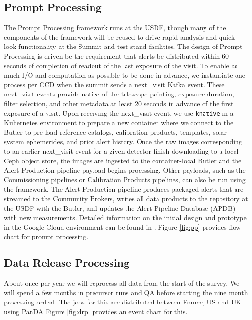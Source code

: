 \documentclass[11pt,twoside]{article}
\begin{document}
\subsection{Prompt Processing} \label{sec:prompt}
The Prompt Processing framework runs at the USDF, though many of the components of the framework will be reused to drive rapid analysis and quick-look functionality at the Summit and test stand facilities.
The design of Prompt Processing is driven be the requirement that alerts be distributed within 60 seconds of completion of readout of the last exposure of the visit.
To enable as much I/O and computation as possible to be done in advance, we instantiate one process per CCD when the summit sends a next\_visit Kafka event.
These next\_visit events provide notice of the telescope pointing, exposure duration, filter selection, and other metadata at least 20 seconds in advance of the first exposure of a visit.
Upon receiving the next\_visit event, we use \texttt{knative} in a Kubernetes environment to prepare a new container where we connect to the Butler to pre-load reference catalogs, calibration products, templates, solar system ephemerides, and prior alert history.
Once the raw images corresponding to an earlier next\_visit event for a given detector finish downloading to a local Ceph object store, the images are ingested to the container-local Butler and the Alert Production pipeline payload begins processing.
Other payloads, such as the Commissioning pipelines or Calibration Products pipelines, can also be run using the framework.
The Alert Production pipeline produces packaged alerts that are streamed to the Community Brokers, writes all data products to the repository at the USDF with the Butler, and updates the Alert Pipeline Database (APDB) with new measurements.
Detailed information on the initial design and prototype in the Google Cloud environment can be found in \citet{DMTN-219}.
Figure \ref{fig:pp} provides flow chart for prompt processing.

\begin{centering}
\end{centering}

\subsection{Data Release Processing}\label{sec:DRP}
About once per year we will reprocess all data from the start of the survey.
We will spend a few months in precursor runs and QA before starting the nine month processing ordeal.
The jobs for this are distributed between France, US and UK using PanDA \citep{DMTN-213}
Figure \ref{fig:drp} provides an event chart for this.
\end{document}
